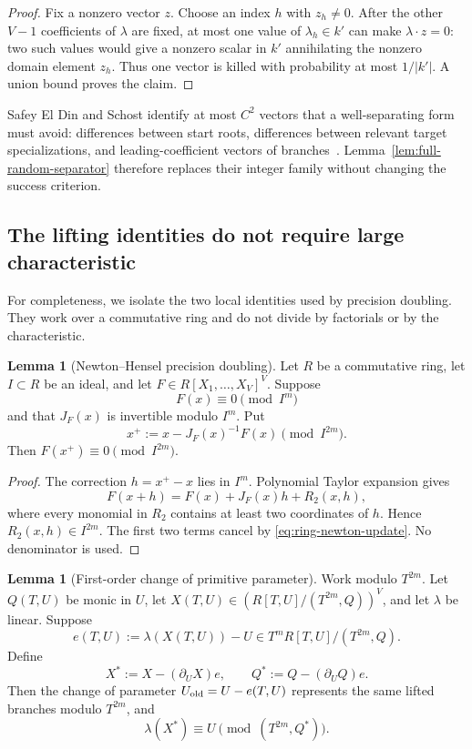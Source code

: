 \documentclass[11pt,a4paper]{article}
\theoremstyle{definition}
\newtheorem{lemma}[theorem]{Lemma}
\theoremstyle{remark}
\begin{document}
\begin{proof}
Fix a nonzero vector $z$.  Choose an index $h$ with $z_h\ne0$.  After the other $V-1$ coefficients of $\lambda$ are fixed, at most one value of $\lambda_h\in k'$ can make $\lambda\cdot z=0$: two such values would give a nonzero scalar in $k'$ annihilating the nonzero domain element $z_h$.  Thus one vector is killed with probability at most $1/|k'|$.  A union bound proves the claim.
\end{proof}

Safey El Din and Schost identify at most $C^2$ vectors that a well-separating form must avoid: differences between start roots, differences between relevant target specializations, and leading-coefficient vectors of branches~\cite[Lem.~14 and Rem.~15]{SafeySchost2018}.  Lemma~\ref{lem:full-random-separator} therefore replaces their integer family without changing the success criterion.

\subsection{The lifting identities do not require large characteristic}
For completeness, we isolate the two local identities used by precision doubling.  They work over a commutative ring and do not divide by factorials or by the characteristic.

\begin{lemma}[Newton--Hensel precision doubling]\label{lem:ring-newton-hensel}
Let $R$ be a commutative ring, let $I\subset R$ be an ideal, and let
$F\in R[X_1,\ldots,X_V]^V$.  Suppose
\[
 F(x)\equiv0\pmod{I^m}
\]
and that $J_F(x)$ is invertible modulo $I^m$.  Put
\begin{equation}\label{eq:ring-newton-update}
 x^+:=x-J_F(x)^{-1}F(x)\pmod{I^{2m}}.
\end{equation}
Then $F(x^+)\equiv0\pmod{I^{2m}}$.
\end{lemma}

\begin{proof}
The correction $h=x^+-x$ lies in $I^m$.  Polynomial Taylor expansion gives
\[
 F(x+h)=F(x)+J_F(x)h+R_2(x,h),
\]
where every monomial in $R_2$ contains at least two coordinates of $h$.  Hence
$R_2(x,h)\in I^{2m}$.  The first two terms cancel by \eqref{eq:ring-newton-update}.  No denominator is used.
\end{proof}

\begin{lemma}[First-order change of primitive parameter]\label{lem:primitive-renormalization}
Work modulo $T^{2m}$.  Let $Q(T,U)$ be monic in $U$, let
$X(T,U)\in(R[T,U]/(T^{2m},Q))^V$, and let $\lambda$ be linear.  Suppose
\[
 e(T,U):=\lambda(X(T,U))-U\in T^mR[T,U]/(T^{2m},Q).
\]
Define
\begin{equation}\label{eq:primitive-update}
 X^*:=X-(\partial_U X)e,
 \qquad
 Q^*:=Q-(\partial_U Q)e.
\end{equation}
Then the change of parameter $U_{\rm old}=U-e(T,U)$ represents the same lifted branches modulo $T^{2m}$, and
\begin{equation}\label{eq:primitive-restored}
 \lambda(X^*)\equiv U\pmod{(T^{2m},Q^*)}.
\end{equation}
\end{lemma}
\end{document}
